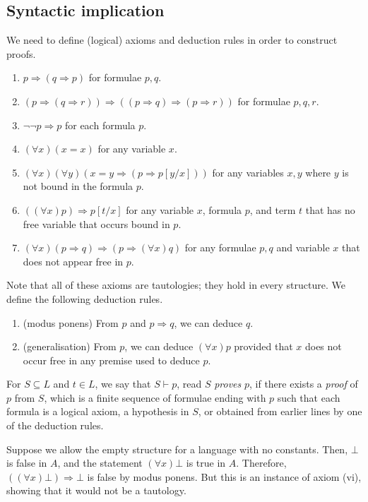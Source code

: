 \subsection{Syntactic implication}
We need to define (logical) axioms and deduction rules in order to construct proofs.
\begin{enumerate}
    \item \( p \Rightarrow (q \Rightarrow p) \) for formulae \( p, q \).
    \item \( (p \Rightarrow (q \Rightarrow r)) \Rightarrow ((p \Rightarrow q) \Rightarrow (p \Rightarrow r)) \) for formulae \( p, q, r \).
    \item \( \neg\neg p \Rightarrow p \) for each formula \( p \).
    \item \( (\forall x)(x = x) \) for any variable \( x \).
    \item \( (\forall x)(\forall y)(x = y \Rightarrow (p \Rightarrow p[y/x])) \) for any variables \( x, y \) where \( y \) is not bound in the formula \( p \).
    \item \( ((\forall x)p) \Rightarrow p[t/x] \) for any variable \( x \), formula \( p \), and term \( t \) that has no free variable that occurs bound in \( p \).
    \item \( (\forall x)(p \Rightarrow q) \Rightarrow (p \Rightarrow (\forall x)q) \) for any formulae \( p, q \) and variable \( x \) that does not appear free in \( p \).
\end{enumerate}
Note that all of these axioms are tautologies; they hold in every structure.
We define the following deduction rules.
\begin{enumerate}
    \item (modus ponens) From \( p \) and \( p \Rightarrow q \), we can deduce \( q \).
    \item (generalisation) From \( p \), we can deduce \( (\forall x)p \) provided that \( x \) does not occur free in any premise used to deduce \( p \).
\end{enumerate}
For \( S \subseteq L \) and \( t \in L \), we say that \( S \vdash p \), read \( S \) \emph{proves} \( p \), if there exists a \emph{proof} of \( p \) from \( S \), which is a finite sequence of formulae ending with \( p \) such that each formula is a logical axiom, a hypothesis in \( S \), or obtained from earlier lines by one of the deduction rules.
\begin{remark}
    Suppose we allow the empty structure for a language with no constants.
    Then, \( \bot \) is false in \( A \), and the statement \( (\forall x)\bot \) is true in \( A \).
    Therefore, \( ((\forall x)\bot) \Rightarrow \bot \) is false by modus ponens.
    But this is an instance of axiom (vi), showing that it would not be a tautology.
\end{remark}
